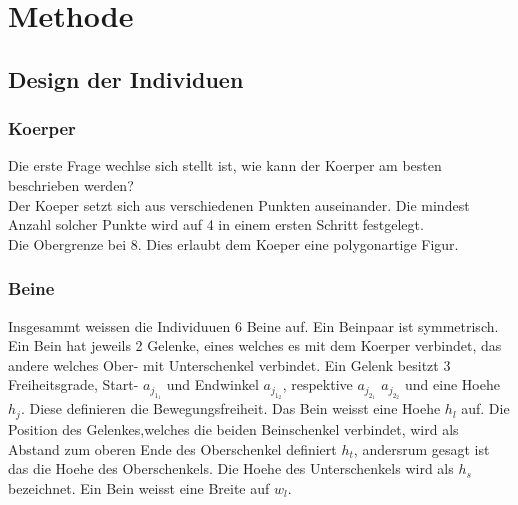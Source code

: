 %
%


\chapter{Methode}

  \section{Design der Individuen}

    \subsection{Koerper}
    \label{sub:Koerper}
      Die erste Frage wechlse sich stellt ist, wie kann der Koerper am besten beschrieben werden? \\
      Der Koeper setzt sich aus verschiedenen Punkten auseinander. Die mindest Anzahl solcher Punkte wird auf 4 in einem ersten Schritt festgelegt. \\
      Die Obergrenze bei 8. Dies erlaubt dem Koeper eine polygonartige Figur.
    \subsection {Beine}
    \label{sub:Beine}
      Insgesammt weissen die Individuuen 6 Beine auf. Ein Beinpaar ist symmetrisch. Ein Bein hat jeweils 2 Gelenke, eines welches es mit dem Koerper verbindet,
      das andere welches Ober- mit Unterschenkel verbindet. Ein Gelenk besitzt 3 Freiheitsgrade, Start- \(a_{j_{1_{1}}}\)  und Endwinkel \(a_{j_{1_{2}}}\),
      respektive \(a_{j_{2_{1}}}\) \(a_{j_{2_{2}}}\) und eine Hoehe \(h_{j}\).
      Diese definieren die Bewegungsfreiheit. Das Bein weisst eine Hoehe \(h_{l}\) auf. Die Position des Gelenkes,welches die beiden Beinschenkel verbindet,
      wird als Abstand zum oberen Ende des Oberschenkel definiert \(h_{t}\), andersrum gesagt ist das die Hoehe des Oberschenkels.
      Die Hoehe des Unterschenkels wird als \(h_{s}\) bezeichnet. Ein Bein weisst eine Breite auf \(w_{l}\).
